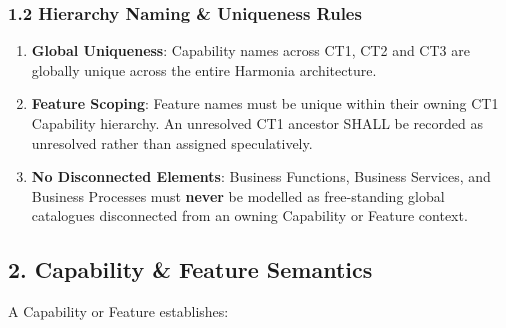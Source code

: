 \label{rad:metamodel:73}
\subsubsection*{1.2 Hierarchy Naming \& Uniqueness Rules}
\label{rad:metamodel:74}

\begin{enumerate}

\item 
\textbf{Global Uniqueness}: Capability names across CT1, CT2 and CT3 are globally unique across the entire Harmonia architecture.



\item 
\textbf{Feature Scoping}: Feature names must be unique within their owning CT1 Capability hierarchy. An unresolved CT1 ancestor SHALL be recorded as unresolved rather than assigned speculatively.



\item 
\textbf{No Disconnected Elements}: Business Functions, Business Services, and Business Processes must \textbf{never} be modelled as free-standing global catalogues disconnected from an owning Capability or Feature context.



\end{enumerate}
\label{rad:metamodel:78}

\par\smallskip
{}\label{rad:metamodel:80}
\subsection*{2. Capability \& Feature Semantics}
\label{rad:metamodel:82}

A Capability or Feature establishes:

\label{rad:metamodel:83}

